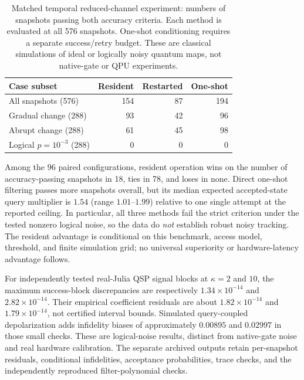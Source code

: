 \documentclass{ieeeaccess}
\begin{document}
\begin{table}[!tbp]\centering\small
\caption{Matched temporal reduced-channel experiment: numbers of snapshots
passing both accuracy criteria. Each method is evaluated at all 576
snapshots. One-shot conditioning requires a separate success/retry budget.
These are classical simulations of ideal or logically noisy quantum maps,
not native-gate or QPU experiments.}
\label{tab:temporalpaired}
\begin{tabular}{lrrr}\toprule
Case subset & Resident & Restarted & One-shot\\\midrule
All snapshots (576) & 154 & 87 & 194\\
Gradual change (288) & 93 & 42 & 96\\
Abrupt change (288) & 61 & 45 & 98\\
Logical $p=10^{-3}$ (288) & 0 & 0 & 0\\\bottomrule
\end{tabular}
\end{table}

Among the 96 paired configurations, resident operation wins on the
number of accuracy-passing snapshots in 18, ties in 78, and loses in none.
Direct one-shot filtering passes more snapshots overall, but its median
expected accepted-state query multiplier is $1.54$ (range $1.01$--$1.99$)
relative to one single attempt at the reported ceiling. In particular,
all three methods fail the strict criterion under the tested nonzero logical
noise, so the data do \emph{not} establish robust noisy tracking.
The resident advantage is conditional on this benchmark, access model,
threshold, and finite simulation grid; no universal superiority or
hardware-latency advantage follows.

For independently tested real-Julia QSP signal blocks at $\kappa=2$ and
$10$, the maximum success-block discrepancies are respectively
$1.34\times10^{-14}$ and $2.82\times10^{-14}$. Their empirical coefficient
residuals are about $1.82\times10^{-14}$ and $1.79\times10^{-14}$,
not certified interval bounds. Simulated query-coupled depolarization
adds infidelity biases of approximately $0.00895$ and $0.02997$ in those
small checks. These are logical-noise results, distinct from native-gate
noise and real hardware calibration. The separate archived outputs retain
per-snapshot residuals, conditional infidelities, acceptance probabilities,
trace checks, and the independently reproduced filter-polynomial checks.
\end{document}
